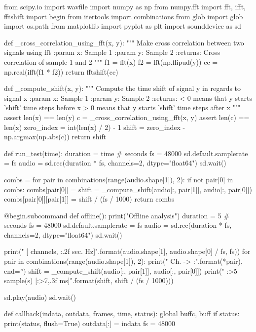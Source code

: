 \begin{mdframed}
    \begin{python}
from scipy.io import wavfile
import numpy as np
from numpy.fft import fft, ifft, fftshift
import begin
from itertools import combinations
from glob import glob
import os.path
from matplotlib import pyplot as plt
import sounddevice as sd


def _cross_correlation_using_fft(x, y):
    """
    Make cross correlation between two signals using fft
    :param x: Sample 1
    :param y: Sample 2
    :returns: Cross correlation of sample 1 and 2
    """
    f1 = fft(x)
    f2 = fft(np.flipud(y))
    cc = np.real(ifft(f1 * f2))
    return fftshift(cc)


def _compute_shift(x, y):
    """
    Compute the time shift of signal y in regards to signal x
    :param x: Sample 1
    :param y: Sample 2
    :returns: < 0 means that y starts 'shift' time steps before x
        > 0 means that y starts 'shift' time steps after x
    """
    assert len(x) == len(y)
    c = _cross_correlation_using_fft(x, y)
    assert len(c) == len(x)
    zero_index = int(len(x) / 2) - 1
    shift = zero_index - np.argmax(np.abs(c))
    return shift

def run_test(time):
    duration = time # seconds
    fs = 48000
    sd.default.samplerate = fs
    audio = sd.rec(duration * fs, channels=2, dtype="float64")
    sd.wait()

    combs = {}
    for pair in combinations(range(audio.shape[1]), 2):
        if not pair[0] in combs:
            combs[pair[0]] = {}
        shift = _compute_shift(audio[:, pair[1]], audio[:, pair[0]])
        combs[pair[0]][pair[1]] = shift / (fs / 1000)
    return combs

@begin.subcommand
def offline():
    print("Offline analysis")
    duration = 5 # seconds
    fs = 48000
    sd.default.samplerate = fs
    audio = sd.rec(duration * fs, channels=2, dtype="float64")
    sd.wait()

    print("  [{} channels, {:.2f} sec. {} Hz]".format(audio.shape[1], audio.shape[0] / fs, fs))
    for pair in combinations(range(audio.shape[1]), 2):
        print("  Ch. {} -> {}:".format(*pair), end='')
        shift = _compute_shift(audio[:, pair[1]], audio[:, pair[0]])
        print(" {:>5} sample(s) [{:>7,.3f} ms]".format(shift, shift / (fs / 1000)))

    sd.play(audio)
    sd.wait()

def callback(indata, outdata, frames, time, status):
    global buffc, buff
    if status:
        print(status, flush=True)
    outdata[:] = indata
    fs = 48000


\end{python}
\end{mdframed}
